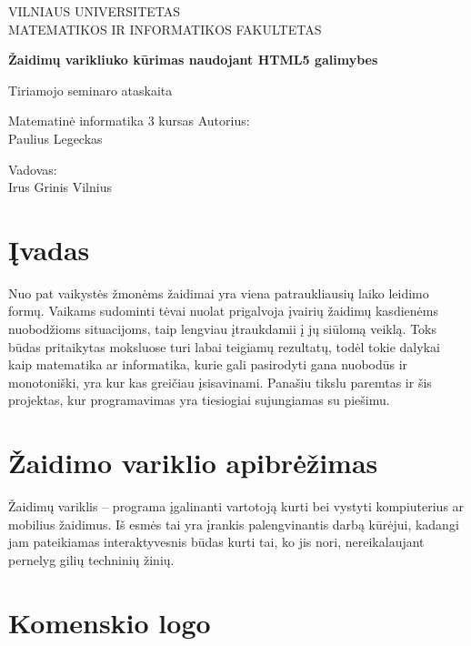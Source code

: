 \documentclass[a4paper,12pt]{article}
\begin{document}
\begin{titlepage}
	\centering
	{\scshape\large VILNIAUS UNIVERSITETAS \\
	MATEMATIKOS IR INFORMATIKOS FAKULTETAS \par}
	\vspace{6cm}
	{\huge\bfseries Žaidimų varikliuko kūrimas naudojant HTML5 galimybes\par}
	{\LARGE Tiriamojo seminaro ataskaita\par}
	{\Large Matematinė informatika 3 kursas}
	\vspace{3cm}
	\vfill
	\flushright
	Autorius: \\ Paulius Legeckas\par
	\vspace{0.5cm}
	Vadovas: \\ Irus Grinis
	\vfill
	\centering
	Vilnius\\
	{\the\year}
\end{titlepage}	
\tableofcontents

\newpage
\section*{Įvadas}


Nuo pat vaikystės žmonėms žaidimai yra viena patraukliausių laiko leidimo formų. Vaikams sudominti tėvai nuolat prigalvoja įvairių žaidimų kasdienėms nuobodžioms situacijoms, taip lengviau įtraukdamii į jų siūlomą veiklą. Toks būdas pritaikytas moksluose turi labai teigiamų rezultatų, todėl tokie dalykai kaip matematika ar informatika, kurie gali pasirodyti gana nuobodūs ir monotoniški, yra kur kas greičiau įsisavinami. Panašiu tikslu paremtas ir šis projektas, kur programavimas yra tiesiogiai sujungiamas su piešimu. \



\newpage
\section{Žaidimo variklio apibrėžimas}

Žaidimų variklis – programa įgalinanti vartotoją kurti bei vystyti kompiuterius ar mobilius žaidimus. Iš esmės tai yra įrankis palengvinantis darbą kūrėjui, kadangi jam pateikiamas interaktyvesnis būdas kurti tai, ko jis nori, nereikalaujant pernelyg gilių techninių žinių.\\

\section{Komenskio logo}
\end{document}
